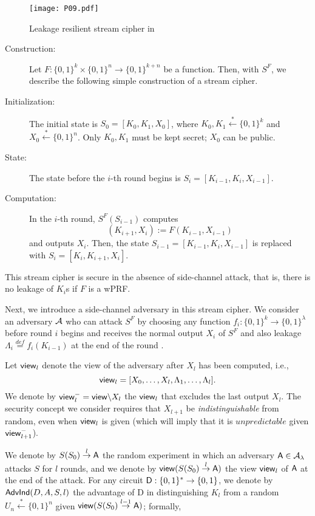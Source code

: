 \documentclass[english]{llncs}
\begin{document}
\begin{figure}
\begin{center}
\texttt{[image: P09.pdf]}
\caption{Leakage resilient stream cipher in \cite{P09}}
\label{fig:P09}
\end{center}
\end{figure}



\begin{description}
\item [{Construction:}] Let $F:\{0,1\}^{k}\times\{0,1\}^{n}\to\{0,1\}^{k+n}$
be a function. Then, with $S^{F}$, we describe the following simple
construction of a stream cipher. 
\item [{Initialization:}] The initial state is $S_{0}=[K_{0},K_{1},X_{0}]$,
where $K_{0},K_{1}\stackrel{*}{\leftarrow}\{0,1\}^{k}$ and $X_{0}\stackrel{*}{\leftarrow}\{0,1\}^{n}$.
Only $K_{0},K_{1}$ must be kept secret; $X_{0}$ can be public. 
\item [{State:}] The state before the $i$-th round begins is $S_{i}=[K_{i-1},K_{i},X_{i-1}]$. 
\item [{Computation:}] In the $i$-th round, $S^{F}(S_{i-1})$ computes
\[
(K_{i+1},X_{i}):=F(K_{i-1},X_{i-1})\]
 and outputs $X_{i}$. Then, the state $S_{i-1}=[K_{i-1},K_{i},X_{i-1}]$
is replaced with $S_{i}=[K_{i},K_{i+1},X_{i}]$. 
\end{description}
This stream cipher is secure in the absence of side-channel attack,
that is, there is no leakage of $K_{i}$s if $F$ is a wPRF.

Next, we introduce a side-channel adversary in this stream cipher.
We consider an adversary ${\cal A}$ who can attack $S^{F}$ by choosing
any function $f_{i}:\{0,1\}^{k}\to\{0,1\}^{\lambda}$ before round
$i$ begins and receives the normal output $X_{i}$ of $S^{F}$ and
also leakage $\Lambda_{i}\stackrel{def}{=}f_{i}(K_{i-1})$ at the
end of the round .

Let ${\sf view}_{l}$ denote the view of the adversary after $X_{l}$
has been computed, i.e., \[
{\sf view}_{l}=[X_{0},\dots,X_{l},\Lambda_{1},\dots,\Lambda_{l}].\]
 We denote by ${\sf view}_{l}^{-}={\sf view}\backslash X_{l}$ the
${\sf view}_{l}$ that excludes the last output $X_{l}$. The security
concept we consider requires that $X_{l+1}$ be \textit{indistinguishable}
from random, even when ${\sf view}_{l}$ is given (which will imply
that it is $unpredictable$ given ${\sf view}_{l+1}^{-}$).

We denote by $S(S_{0})\stackrel{l}{\to}{\sf A}$ the random experiment
in which an adversary ${\sf A}\in{\cal A}_{\lambda}$ attacks $S$
for $l$ rounds, and we denote by ${\sf view}(S(S_{0})\stackrel{l}{\to}{\sf A})$
the view ${\sf view}_{l}$ of ${\sf A}$ at the end of the attack.
For any circuit ${\sf D}:\{0,1\}^{*}\to\{0,1\}$, we denote by ${\sf AdvInd}(D,A,S,l)$
the advantage of D in distinguishing $K_{l}$ from a random $U_{n}\stackrel{*}{\leftarrow}\{0,1\}^{n}$
given ${\sf view}(S(S_{0})\stackrel{l-1}{\to}{\sf A})$; formally,
\end{document}
